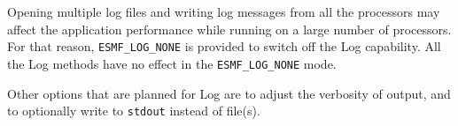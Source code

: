 Opening multiple log files and writing log messages from all the processors
may affect the application performance while running on a large number of
processors.  For that reason, {\tt ESMF\_LOG\_NONE} is provided to
switch off the Log capability.  All the Log methods have no effect
in the {\tt ESMF\_LOG\_NONE} mode. 
   
Other options that are planned for Log are to adjust the verbosity of output, and to optionally write to {\tt stdout} instead of file(s).




